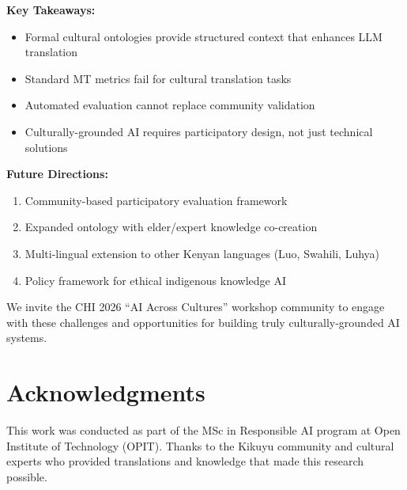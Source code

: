 \documentclass[sigconf,nonacm]{acmart}
\begin{document}
\textbf{Key Takeaways:}
\begin{itemize}
    \item Formal cultural ontologies provide structured context that enhances LLM translation
    \item Standard MT metrics fail for cultural translation tasks
    \item Automated evaluation cannot replace community validation
    \item Culturally-grounded AI requires participatory design, not just technical solutions
\end{itemize}

\textbf{Future Directions:}
\begin{enumerate}
    \item Community-based participatory evaluation framework
    \item Expanded ontology with elder/expert knowledge co-creation
    \item Multi-lingual extension to other Kenyan languages (Luo, Swahili, Luhya)
    \item Policy framework for ethical indigenous knowledge AI
\end{enumerate}

We invite the CHI 2026 ``AI Across Cultures'' workshop community to engage with these challenges and opportunities for building truly culturally-grounded AI systems.

\section*{Acknowledgments}

This work was conducted as part of the MSc in Responsible AI program at Open Institute of Technology (OPIT). Thanks to the Kikuyu community and cultural experts who provided translations and knowledge that made this research possible.




\end{document}
